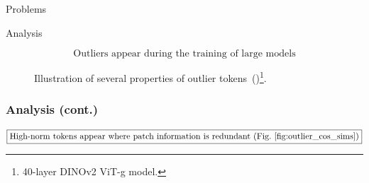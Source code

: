 \documentclass[aspectratio=169]{beamer}
\begin{document}
\begin{section}{Problems}
\begin{subsection}{Analysis}
\begin{frame}
$$
\boxed{\text{Outliers appear during the training of large models}}
$$

\vspace{1em}
\begin{figure}[t]
    \centering
    \vspace{-0.648em}
    \caption{
        Illustration of several properties of outlier tokens~(\cite{darcetVisionTransformersNeed2024})\footnote{40-layer DINOv2 ViT-g model.}.
    }
    \label{fig:factors_choice}
\end{figure}
\end{frame}

\begin{frame}
\frametitle{Analysis (cont.)}
\vspace{1em}

$$
\boxed{\text{High-norm tokens appear where patch information is redundant (Fig.~\ref{fig:outlier_cos_sims})}}
$$


\end{frame}
\end{subsection}
\end{section}
\end{document}
